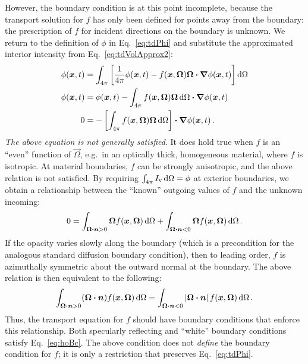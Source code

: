 However, the boundary condition is at this point incomplete, because the
transport
solution for $f$ has only been defined for points away from the boundary: the
prescription of $f$ for incident directions on the boundary is unknown.
We return to
the definition of $\phi$ in Eq.~\eqref{eq:tdPhi} and substitute the approximated
interior intensity from Eq.~\eqref{eq:tdVolApprox2}:
\begin{align*}
  \phi(\bm{x},t) &= \int_{4\pi} \left[ 
\frac{1}{4\pi} \phi (\bm{x},t)
  - f(\bm{x}, \bm{\Omega})\bm{\Omega}\bm{\cdot} \bm{\nabla} \phi(\bm{x},t)
  \right] \mathop{}\!\mathrm{d} \Omega
  \\
  \phi(\bm{x},t) &= \phi (\bm{x},t)
  - \int_{4\pi} f(\bm{x}, \bm{\Omega})\bm{\Omega} \mathop{}\!\mathrm{d} \Omega
  \bm{\cdot} \bm{\nabla} \phi(\bm{x},t)
  \\
  0 &= - \left[ \int_{4\pi} f(\bm{x}, \bm{\Omega})\bm{\Omega} \mathop{}\!\mathrm{d}\Omega
  \right]
  \bm{\cdot} \bm{\nabla} \phi(\bm{x},t) \,.
\end{align*}
\emph{The above equation is not generally satisfied}. It does hold true when
$f$ is an ``even'' function of $\vec{\Omega}$, e.g.\ in an optically thick,
homogeneous material, where $f$ is isotropic. At material
boundaries, $f$ can be strongly anisotropic, and the above relation is not
satisfied. By requiring $\int_{4\pi} I_\mathrm{v} \mathop{}\!\mathrm{d}\Omega = \phi$ at exterior
boundaries, we
obtain a relationship between the ``known'' outgoing values of $f$ and the
unknown incoming:
\begin{equation*}
  0 =
  \int_{\bm{\Omega}\bm{\cdot}\bm{n} > 0} \bm{\Omega} f(\bm{x}, \bm{\Omega}) \mathop{}\!\mathrm{d} \Omega
 + \int_{\bm{\Omega}\bm{\cdot}\bm{n} < 0} \bm{\Omega} f(\bm{x}, \bm{\Omega}) \mathop{}\!\mathrm{d}
 \Omega\,.
\end{equation*}
If the opacity varies slowly along the boundary (which is a precondition for the
analogous standard diffusion boundary condition), then to leading order, $f$
is azimuthally symmetric about the outward normal at the boundary. The above
relation is then equivalent to the following:
\begin{equation}\label{eq:hoBc}
  \int_{\bm{\Omega}\bm{\cdot}\bm{n} > 0} (\bm{\Omega}\bm{\cdot} \bm{n})
  f(\bm{x}, \bm{\Omega}) \mathop{}\!\mathrm{d}\Omega
  =
  \int_{\bm{\Omega}\bm{\cdot}\bm{n} < 0} \left| \bm{\Omega}\bm{\cdot} \bm{n} \right|
  f(\bm{x}, \bm{\Omega}) \mathop{}\!\mathrm{d}\Omega \,.
\end{equation}
Thus, the transport equation for $f$ should have boundary conditions
that enforce this relationship. Both specularly reflecting and
``white'' boundary conditions satisfy Eq.~\eqref{eq:hoBc}.
The above condition does not \emph{define} the boundary condition for $f$; it
is only a restriction that preserves Eq.~\eqref{eq:tdPhi}.

